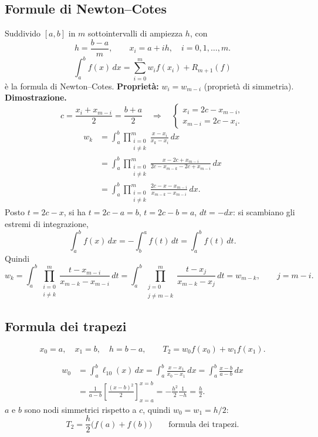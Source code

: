 \subsection*{Formule di Newton--Cotes}
Suddivido $[a,b]$ in $m$ sottointervalli di ampiezza $h$, con
\[h=\frac{b-a}{m},\qquad x_i=a+ih,\quad i=0,1,\ldots,m.\]
\[\int_a^b f(x)\,dx=\sum_{i=0}^m w_i f(x_i)+R_{m+1}(f)\]
è la formula di Newton--Cotes.
\textbf{Proprietà:} $w_i=w_{m-i}$ (proprietà di simmetria).
\textbf{Dimostrazione.}
\[c=\frac{x_i+x_{m-i}}2=\frac{b+a}2\quad\Longrightarrow\quad
\begin{cases}x_i=2c-x_{m-i},\\x_{m-i}=2c-x_i.\end{cases}\]
\begin{align*}
w_k&=\int_a^b\prod_{\substack{i=0\\i\ne k}}^m\frac{x-x_i}{x_k-x_i}\,dx\\
&=\int_a^b\prod_{\substack{i=0\\i\ne k}}^m\frac{x-2c+x_{m-i}}{2c-x_{m-k}-2c+x_{m-i}}\,dx\\
&=\int_a^b\prod_{\substack{i=0\\i\ne k}}^m\frac{2c-x-x_{m-i}}{x_{m-k}-x_{m-i}}\,dx.
\end{align*}
Posto $t=2c-x$, si ha $t=2c-a=b$, $t=2c-b=a$, $dt=-dx$: si scambiano gli estremi di integrazione,
\[\int_a^b f(x)\,dx=-\int_b^a f(t)\,dt=\int_a^b f(t)\,dt.\]
Quindi
\[w_k=\int_a^b\prod_{\substack{i=0\\i\ne k}}^m\frac{t-x_{m-i}}{x_{m-k}-x_{m-i}}\,dt
=\int_a^b\prod_{\substack{j=0\\j\ne m-k}}^m\frac{t-x_j}{x_{m-k}-x_j}\,dt=w_{m-k},\qquad j=m-i.\]
\subsection*{Formula dei trapezi}
\[x_0=a,\quad x_1=b,\quad h=b-a,\qquad T_2=w_0f(x_0)+w_1f(x_1).\]
\begin{center}\end{center}
\begin{align*}
w_0&=\int_a^b\ell_{10}(x)\,dx=\int_a^b\frac{x-x_1}{x_0-x_1}\,dx
=\int_a^b\frac{x-b}{a-b}\,dx\\
&=\frac1{a-b}\left[\frac{(x-b)^2}2\right]_{x=a}^{x=b}
=-\frac{h^2}2\frac1{-h}=\frac h2.
\end{align*}
$a$ e $b$ sono nodi simmetrici rispetto a $c$, quindi $w_0=w_1=h/2$:
\[\boxed{T_2=\frac h2\bigl(f(a)+f(b)\bigr)}\qquad\text{formula dei trapezi}.\]

